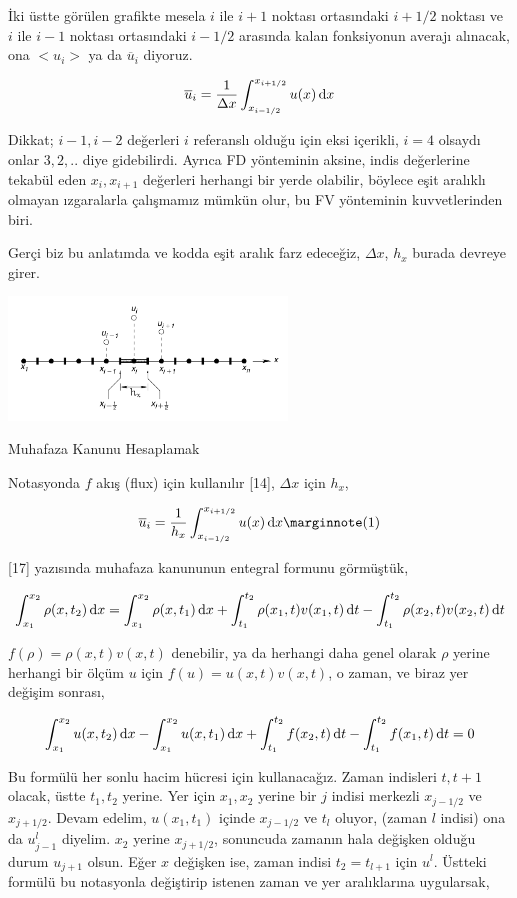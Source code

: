 \documentclass[12pt,fleqn]{article}\usepackage{../../common}
\begin{document}
İki üstte görülen grafikte mesela $i$ ile $i+1$ noktası ortasındaki $i+1/2$
noktası ve $i$ ile $i-1$ noktası ortasındaki $i-1/2$ arasında kalan fonksiyonun
averajı alınacak, ona $< u_i >$ ya da $\overline{u}_i$ diyoruz.

$$
\overline{u}_i = \frac{1}{\Delta x} \int_{x_{i-1/2}}^{x_{i+1/2}} u(x) \,\mathrm{d} x
$$

Dikkat; $i-1,i-2$ değerleri $i$ referanslı olduğu için eksi içerikli, $i=4$
olsaydı onlar $3,2,..$ diye gidebilirdi. Ayrıca FD yönteminin aksine, indis
değerlerine tekabül eden $x_i,x_{i+1}$ değerleri herhangi bir yerde olabilir,
böylece eşit aralıklı olmayan ızgaralarla çalışmamız mümkün olur, bu FV
yönteminin kuvvetlerinden biri. 

Gerçi biz bu anlatımda ve kodda eşit aralık farz edeceğiz, $\Delta x$, $h_x$
burada devreye girer. 

\includegraphics[width=20em]{12-20-00.png}

Muhafaza Kanunu Hesaplamak

Notasyonda $f$ akış (flux) için kullanılır [14], $\Delta x$ için $h_x$,

$$
\overline{u}_i =  \frac{1}{h_x} \int_{x_{i-1/2}}^{x_{i+1/2}} u(x) \ud x
\mlabel{1}
$$

[17] yazısında muhafaza kanununun entegral formunu görmüştük,

$$
\int_{x_1}^{x_2} \rho(x,t_2) \,\mathrm{d} x =
\int_{x_1}^{x_2} \rho(x,t_1) \,\mathrm{d} x  +
\int_{t_1}^{t_2} \rho(x_1,t) v(x_1,t) \,\mathrm{d} t -
\int_{t_1}^{t_2}  \rho(x_2,t) v(x_2,t) \,\mathrm{d} t
$$

$f(\rho) = \rho(x,t) v(x,t)$ denebilir, ya da herhangi daha genel olarak $\rho$
yerine herhangi bir ölçüm $u$ için $f(u) = u(x,t) v(x,t)$, o zaman, ve
biraz yer değişim sonrası,

$$
\int_{x_1}^{x_2} u(x,t_2) \,\mathrm{d} x -
\int_{x_1}^{x_2} u(x,t_1) \,\mathrm{d} x  +
\int_{t_1}^{t_2} f(x_2,t) \,\mathrm{d} t  -
\int_{t_1}^{t_2} f(x_1,t) \,\mathrm{d} t = 0
$$

Bu formülü her sonlu hacim hücresi için kullanacağız. Zaman indisleri $t,t+1$
olacak, üstte $t_1,t_2$ yerine. Yer için $x_1,x_2$ yerine bir $j$ indisi
merkezli $x_{j-1/2}$ ve $x_{j+1/2}$. Devam edelim, $u(x_1,t_1)$ içinde
$x_{j-1/2}$ ve $t_l$ oluyor, (zaman $l$ indisi) ona da $u_{j-1}^l$
diyelim. $x_2$ yerine $x_{j+1/2}$, sonuncuda zamanın hala değişken olduğu durum
$u_{j+1}$ olsun. Eğer $x$ değişken ise, zaman indisi $t_2 = t_{l+1}$ için
$u^{l}$. Üstteki formülü bu notasyonla değiştirip istenen zaman ve yer
aralıklarına uygularsak,
\end{document}
